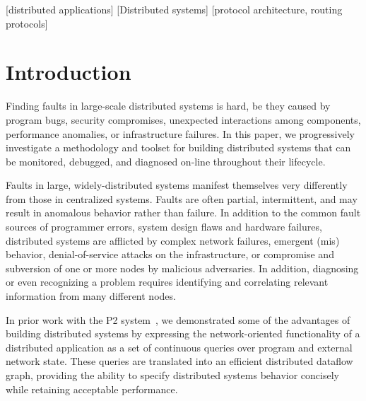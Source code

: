 \documentclass{sig-alt-full}
\begin{document}
[distributed applications]
[Distributed systems]
[protocol architecture, routing protocols]



\pagestyle{plain}

\section{Introduction}

Finding faults in large-scale distributed systems is hard, be they
caused by program bugs, security compromises, unexpected interactions
among components, performance anomalies, or infrastructure failures.
In this paper, we progressively investigate a methodology and toolset
for building distributed systems that can be monitored,
debugged, and diagnosed on-line throughout their lifecycle.

Faults in large, widely-distributed systems manifest themselves very
differently from those in centralized systems. Faults are often partial,
intermittent, and may result in anomalous behavior rather than
failure. In addition to the common fault sources of programmer errors,
system design flaws and hardware failures, distributed systems are
afflicted by complex network failures, emergent (mis) behavior,
denial-of-service attacks on the infrastructure, or compromise and
subversion of one or more nodes by malicious adversaries. In addition,
diagnosing or even recognizing a problem requires identifying and
correlating relevant information from many different nodes.


In prior work with the P2 system~\cite{Loo2005SOSP}, we demonstrated some of the
advantages of building 
distributed systems by expressing the network-oriented functionality
of a distributed application as a set of continuous queries over program and
external network state. These queries are translated into an efficient
distributed dataflow graph, providing the ability to specify
distributed systems behavior concisely while retaining acceptable
performance.
\end{document}
